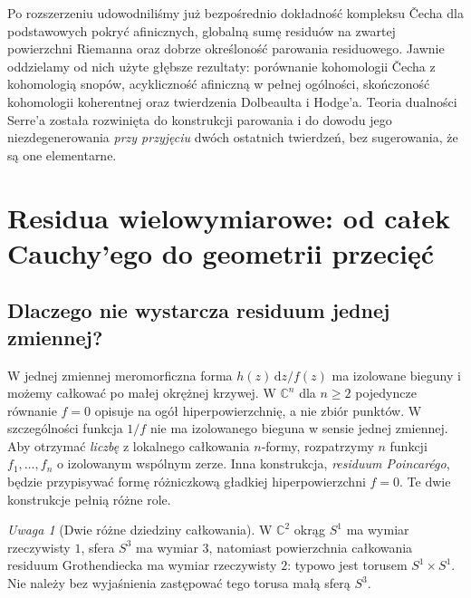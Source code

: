 \documentclass[11pt,a4paper,openany]{report}
\numberwithin{equation}{section}
\theoremstyle{plain}
\theoremstyle{definition}
\theoremstyle{remark}
\newtheorem{uwaga}[twierdzenie]{Uwaga}
\newcommand{\C}{\mathbb C}
\begin{document}
Po rozszerzeniu udowodniliśmy już bezpośrednio dokładność
kompleksu Čecha dla podstawowych pokryć afinicznych,
globalną sumę residuów na zwartej powierzchni Riemanna
oraz dobrze określoność parowania residuowego.
Jawnie oddzielamy od nich użyte głębsze rezultaty:
porównanie kohomologii Čecha z kohomologią snopów,
acykliczność afiniczną w pełnej ogólności, skończoność
kohomologii koherentnej oraz twierdzenia Dolbeaulta
i Hodge'a. Teoria dualności Serre'a została rozwinięta
do konstrukcji parowania i do dowodu jego
niezdegenerowania \emph{przy przyjęciu} dwóch
ostatnich twierdzeń, bez sugerowania, że są one elementarne.


\section{Residua wielowymiarowe: od całek Cauchy'ego do geometrii przecięć}
\label{sec:ga4-residua-wielo}

\subsection{Dlaczego nie wystarcza residuum jednej zmiennej?}

W jednej zmiennej meromorficzna forma $h(z)\,\mathrm dz/f(z)$
ma izolowane bieguny i możemy całkować po małej okrężnej krzywej.
W $\C^n$ dla $n\ge2$ pojedyncze równanie $f=0$ opisuje na ogół
hiperpowierzchnię, a nie zbiór punktów. W szczególności funkcja
$1/f$ nie ma izolowanego bieguna w sensie jednej zmiennej.
Aby otrzymać \emph{liczbę} z lokalnego całkowania $n$-formy,
rozpatrzymy $n$ funkcji $f_1,\ldots,f_n$ o izolowanym wspólnym zerze.
Inna konstrukcja, \emph{residuum Poincarégo}, będzie przypisywać
formę różniczkową gładkiej hiperpowierzchni $f=0$.
Te dwie konstrukcje pełnią różne role.

\begin{uwaga}[Dwie różne dziedziny całkowania]
W $\C^2$ okrąg $S^1$ ma wymiar rzeczywisty $1$, sfera
$S^3$ ma wymiar $3$, natomiast powierzchnia całkowania
residuum Grothendiecka ma wymiar rzeczywisty $2$:
typowo jest torusem $S^1\times S^1$.
Nie należy bez wyjaśnienia zastępować tego torusa małą sferą $S^3$.
\end{uwaga}
\end{document}
